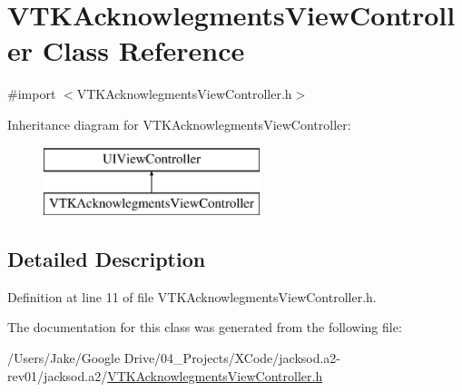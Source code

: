 \hypertarget{interface_v_t_k_acknowlegments_view_controller}{\section{V\+T\+K\+Acknowlegments\+View\+Controller Class Reference}
\label{interface_v_t_k_acknowlegments_view_controller}
}


{\ttfamily \#import $<$V\+T\+K\+Acknowlegments\+View\+Controller.\+h$>$}

Inheritance diagram for V\+T\+K\+Acknowlegments\+View\+Controller\+:\begin{figure}[H]
\begin{center}
\leavevmode
\includegraphics[height=2.000000cm]{interface_v_t_k_acknowlegments_view_controller}
\end{center}
\end{figure}


\subsection{Detailed Description}


Definition at line 11 of file V\+T\+K\+Acknowlegments\+View\+Controller.\+h.



The documentation for this class was generated from the following file\+:\begin{DoxyCompactItemize}
\item 
/\+Users/\+Jake/\+Google Drive/04\+\_\+\+Projects/\+X\+Code/jacksod.\+a2-\/rev01/jacksod.\+a2/\hyperlink{_v_t_k_acknowlegments_view_controller_8h}{V\+T\+K\+Acknowlegments\+View\+Controller.\+h}\end{DoxyCompactItemize}
